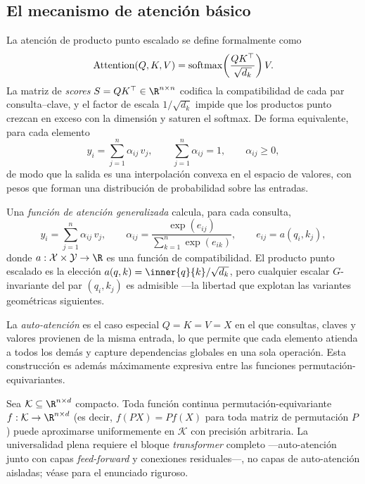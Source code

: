 \subsection{El mecanismo de atenci\'on b\'asico}
\label{subsec:apps:attn-basic}

La atenci\'on de producto punto escalado se define formalmente como
\[
  \operatorname{Attention}(Q, K, V) = \operatorname{softmax}\!\left(\frac{QK^\top}{\sqrt{d_k}}\right) V .
\]
La matriz de \emph{scores} $S = QK^\top \in \R^{n\times n}$ codifica la
compatibilidad de cada par consulta--clave, y el factor de escala
$1/\sqrt{d_k}$ impide que los productos punto crezcan en exceso con la
dimensi\'on y saturen el softmax. De forma equivalente, para cada elemento
\[
  y_i = \sum_{j=1}^{n} \alpha_{ij}\, v_j,
  \qquad \sum_{j=1}^{n}\alpha_{ij} = 1, \qquad \alpha_{ij}\ge 0,
\]
de modo que la salida es una interpolaci\'on convexa en el espacio de valores,
con pesos que forman una distribuci\'on de probabilidad sobre las entradas.

\begin{definition}
\label{def:apps:generalized-attn}
Una \emph{funci\'on de atenci\'on generalizada} calcula, para cada consulta,
\[
  y_i = \sum_{j=1}^{n}\alpha_{ij}\, v_j,
  \qquad
  \alpha_{ij} = \frac{\exp(e_{ij})}{\sum_{k=1}^n \exp(e_{ik})},
  \qquad
  e_{ij} = a(q_i, k_j),
\]
donde $a:\mathcal{X}\times\mathcal{Y}\to\R$ es una funci\'on de compatibilidad.
El producto punto escalado es la elecci\'on $a(q,k) = \inner{q}{k}/\sqrt{d_k}$,
pero cualquier escalar $G$-invariante del par $(q_i, k_j)$ es admisible ---la
libertad que explotan las variantes geom\'etricas siguientes.
\end{definition}

La \emph{auto-atenci\'on} es el caso especial $Q = K = V = X$ en el que
consultas, claves y valores provienen de la misma entrada, lo que permite que
cada elemento atienda a todos los dem\'as y capture dependencias globales en una
sola operaci\'on. Esta construcci\'on es adem\'as m\'aximamente expresiva entre
las funciones permutaci\'on-equivariantes.

\begin{theorem}
\label{thm:apps:self-attn-universal}
Sea $\mathcal{K}\subseteq\R^{n\times d}$ compacto. Toda funci\'on continua
permutaci\'on-equivariante $f:\mathcal{K}\to\R^{n\times d}$ (es decir,
$f(PX) = P f(X)$ para toda matriz de permutaci\'on $P$) puede aproximarse
uniformemente en $\mathcal{K}$ con precisi\'on arbitraria. La universalidad plena
requiere el bloque \emph{transformer} completo ---auto-atenci\'on junto con capas
\emph{feed-forward} y conexiones residuales---, no capas de auto-atenci\'on
aisladas; v\'ease \citet{yun2020transformers} para el enunciado riguroso.
\end{theorem}


